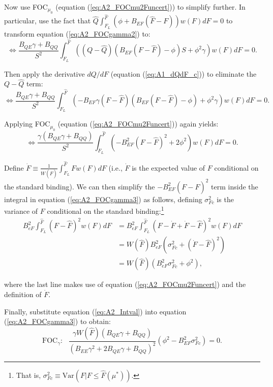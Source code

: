 \documentclass[12pt]{article}
\begin{document}
Now use FOC$_{\mu_0}$ (equation (\ref{eq:A2_FOCmu2Funcert})) to simplify further. In particular, use the fact that $\hat{Q}\int_{F_L}^{\hat{F}}\left(\phi+B_{EF}(\hat{F}-F)\right)w(F)dF=0$ to transform equation (\ref{eq:A2_FOCgamma2}) to:
\begin{equation}
\Leftrightarrow \frac{B_{QE}\gamma+B_{QQ}}{S^2} \int_{F_L}^{\hat{F}}\left((Q-\hat{Q})(B_{EF}(F-\hat{F})-\phi)S + \phi^2\gamma\right)w(F)dF=0.
\end{equation}

Then apply the derivative $dQ/dF$ (equation (\ref{eq:A1_dQdF_c})) to eliminate the $Q-\hat{Q}$ term:
\begin{equation}
\Leftrightarrow \frac{B_{QE}\gamma+B_{QQ}}{S^2} \int_{F_L}^{\hat{F}}\left(-B_{EF}\gamma(F-\hat{F})(B_{EF}(F-\hat{F})-\phi) + \phi^2\gamma\right)w(F)dF=0.
\end{equation}

Applying FOC$_{\mu_0}$ (equation (\ref{eq:A2_FOCmu2Funcert})) again yields:
\begin{equation}
\Leftrightarrow \frac{\gamma(B_{QE}\gamma+B_{QQ})}{S^2} \int_{F_L}^{\hat{F}}\left(-B_{EF}^2(F-\hat{F})^2 + 2\phi^2\right)w(F)dF=0. \label{eq:A2_FOCgamma3}
\end{equation}

Define $\dot{F}\equiv\frac{1}{W(\hat{F})}\int_{F_L}^{\hat{F}}Fw(F)dF$ (i.e., $\dot{F}$ is the expected value of $F$ conditional on the standard binding). We can then simplify the $-B_{EF}^2(F-\hat{F})^2$ term inside the integral in equation (\ref{eq:A2_FOCgamma3}) as follows, defining $\sigma_{Fc}^2$ is the variance of $F$ conditional on the standard binding:\footnote{That is, $\sigma_{Fc}^2\equiv \text{Var}(F|F\leq\hat{F}(\mu^*))$.}
\begin{align}
B_{eF}^2\int_{F_L}^{\hat{F}}(F-\hat{F})^2w(F)dF&=B_{eF}^2\int_{F_L}^{\hat{F}}(F-\dot{F}+\dot{F}-\hat{F})^2w(F)dF \nonumber \\
&=W(\hat{F})B_{eF}^2(\sigma_{Fc}^2+(\dot{F}-\hat{F})^2) \nonumber \\
&=W(\hat{F})(B_{eF}^2\sigma_{Fc}^2+\phi^2), \label{eq:A2_Intval}
\end{align}

where the last line makes use of equation (\ref{eq:A2_FOCmu2Funcert}) and the definition of $\dot{F}$.

Finally, substitute equation (\ref{eq:A2_Intval}) into equation (\ref{eq:A2_FOCgamma3}) to obtain:
\begin{equation}
\text{FOC}_{\gamma}: \text{ } \frac{\gamma W(\hat{F})(B_{QE}\gamma+B_{QQ})}{(B_{EE}\gamma^2+2B_{QE}\gamma+B_{QQ})^2}(\phi^2-B_{EF}^2\sigma_{Fc}^2) = 0. \label{eq:A2_FOCgamma2Funcert}
\end{equation}
\end{document}
